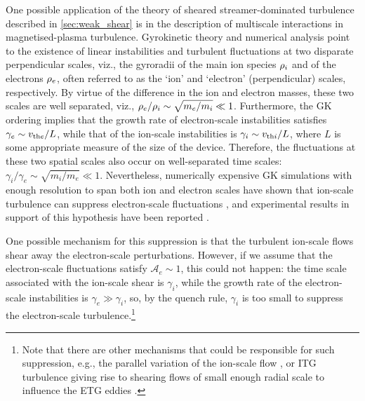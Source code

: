 \documentclass{jpp}
\newcommand{\A}{\mathcal{A}}
\begin{document}
One possible application of the theory of sheared streamer-dominated turbulence described in \cref{sec:weak_shear} is in the description of multiscale interactions in magnetised-plasma turbulence. Gyrokinetic theory and numerical analysis point to the existence of linear instabilities and turbulent fluctuations at two disparate perpendicular scales, viz., the gyroradii of the main ion species \(\rho_i\) and of the electrons \(\rho_e\), often referred to as the `ion' and `electron' (perpendicular) scales, respectively. By virtue of the difference in the ion and electron masses, these two scales are well separated, viz., \(\rho_e/\rho_i \sim \sqrt{m_e/m_i} \ll 1\). Furthermore, the GK ordering implies that the growth rate of electron-scale instabilities satisfies \(\gamma_e \sim v_{\text{th}e}/L\), while that of the ion-scale instabilities is \mbox{\(\gamma_i \sim v_{\text{th}i}/L\)}, where \(L\) is some appropriate measure of the size of the device. Therefore, the fluctuations at these two spatial scales also occur on well-separated time scales: \(\gamma_i/\gamma_e \sim \sqrt{m_i / m_e} \ll 1\). Nevertheless, numerically expensive GK simulations with enough resolution to span both ion and electron scales have shown that ion-scale turbulence can suppress electron-scale fluctuations \citep{candy07, waltz07, maeyama15, howard16a}, and experimental results in support of this hypothesis have been reported \citep{howard16b}. 

One possible mechanism for this suppression is that the turbulent ion-scale \exb{} flows shear away the electron-scale perturbations. However, if we assume that the electron-scale fluctuations satisfy \(\A_{e} \sim 1\), this could not happen: the time scale associated with the ion-scale \exb{} shear is \(\gamma_i\), while the growth rate of the electron-scale instabilities is \(\gamma_e \gg \gamma_i\), so, by the quench rule, \(\gamma_i\) is too small to suppress the electron-scale turbulence.\footnote{Note that there are other mechanisms that could be responsible for such suppression, e.g., the parallel variation of the ion-scale \exb{} flow \citep{hardman19, hardman20}, or ITG turbulence giving rise to shearing flows of small enough radial scale to influence the ETG eddies \citep{holland04}.}
\end{document}

